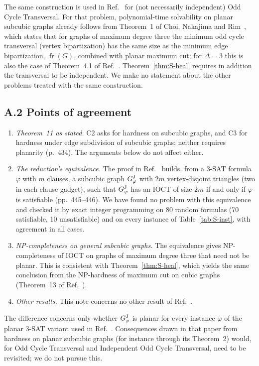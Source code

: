 \documentclass[aps,pre,onecolumn,nofootinbib]{revtex4-2}
\theoremstyle{remark}
\newcommand{\fr}{\operatorname{fr}}
\begin{document}
The same construction is used in Ref.~\cite{Johnson2025} for (not necessarily independent) Odd
Cycle Transversal. For that problem, polynomial-time solvability on planar subcubic graphs already
follows from Theorem~1 of Choi, Nakajima and Rim~\cite{Choi1989}, which states that for graphs of
maximum degree three the minimum odd cycle transversal (vertex bipartization) has the same size as
the minimum edge bipartization, $\fr(G)$, combined with planar maximum cut; for $\Delta=3$ this is also the case of Theorem~4.1 of
Ref.~\cite{Akbari2022}. Theorem~\ref{thm:S-heal} requires in addition the transversal to be
independent. We make no statement
about the other problems treated with the same construction.

\subsection*{A.2 Points of agreement}

\begin{enumerate}
\item \emph{Theorem~11 as stated.} C2 asks for hardness on subcubic graphs, and C3 for hardness
under edge subdivision of subcubic graphs; neither requires planarity (p.~434). The arguments
below do not affect either.
\item \emph{The reduction's equivalence.} The proof in Ref.~\cite{Johnson2025} builds, from a
3-SAT formula $\varphi$ with $m$ clauses, a subcubic graph $G^{\rm J}_\varphi$ with $2m$ vertex-disjoint
triangles (two in each clause gadget), such that $G^{\rm J}_\varphi$ has an IOCT of size $2m$ if and only
if $\varphi$ is satisfiable (pp.~445--446). We
have found no problem with this equivalence and checked it by exact integer programming on 80
random formulas (70 satisfiable, 10 unsatisfiable) and on every instance of Table~\ref{tab:S-inst},
with agreement in all cases.
\item \emph{NP-completeness on general subcubic graphs.} The equivalence gives NP-completeness of
IOCT on graphs of maximum degree three that need not be planar. This is consistent with
Theorem~\ref{thm:S-heal}, which yields the same conclusion from the NP-hardness of maximum cut on
cubic graphs (Theorem~13 of Ref.~\cite{Yannakakis1978}).
\item \emph{Other results.} This note concerns no other result of Ref.~\cite{Johnson2025}.
\end{enumerate}
The difference concerns only whether $G^{\rm J}_\varphi$ is planar for every instance $\varphi$ of the
planar 3-SAT variant used in Ref.~\cite{Johnson2025}. Consequences drawn in that paper from
hardness on planar subcubic graphs (for instance through its Theorem~2) would, for Odd Cycle
Transversal and Independent Odd Cycle Transversal, need to be revisited; we do not pursue this.
\end{document}
